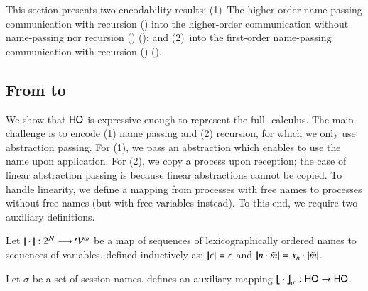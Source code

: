 \noi This section presents two encodability results:
(1)~The higher-order name-passing communication with recursion (\HOp) into 
the higher-order communication without name-passing nor 
recursion (\HO) (); and 
(2)~\HOp into the first-order name-passing communication
with recursion (\sessp) (). 

 


\subsection{From \HOp to \HO}
\label{subsec:HOpi_to_HO}
\noi We show that $\mathsf{HO}$ is expressive enough to
represent the full
 \HOp-calculus.
The main challenge is to encode (1) name passing 
and (2) recursion, 
for which 
we only use  abstraction passing. For (1), we pass  
an %
abstraction which enables to use the name upon application. 
For (2), we 
copy a process upon reception; the case of linear abstraction passing
is  
because 
linear abstractions cannot be copied.
To handle linearity, we define 
a mapping from processes with free names to processes without free
names (but with free variables instead).
To this end, we require two auxiliary definitions.

\smallskip 

\begin{definition}\rm 
\label{def:hop_to_ho}
	Let $|\!|\cdot|\!|: 2^{\mathcal{N}} \longrightarrow \mathcal{V}^\omega$
	be a map of sequences of 
lexicographically ordered names to sequences of variables, defined
	inductively as: 
	$|\!|\epsilon|\!| = \epsilon$ and $|\!|n \cdot \tilde{m}|\!| = x_n \cdot |\!|\tilde{m}|\!|$. 
\end{definition}

\smallskip 

%

\begin{definition} \label{d:trabs}\label{d:auxmap}
	Let $\sigma$ be a set of session names.
	 defines an auxiliary mapping
	$\big\lfloor\!\!\big\lfloor\cdot\big\rfloor\!\!\big\rfloor^{}_\sigma: \mathsf{HO} \to \mathsf{HO}$.
\end{definition}

